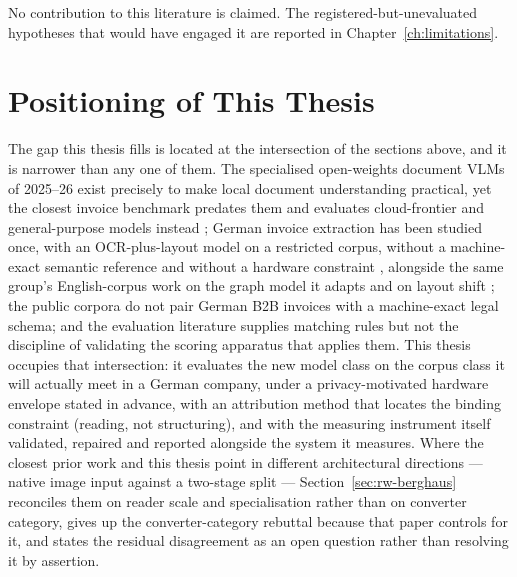 No contribution to this literature is claimed. The registered-but-unevaluated hypotheses
that would have engaged it are reported in Chapter~\ref{ch:limitations}.

\section{Positioning of This Thesis}
\label{sec:rw-positioning}

The gap this thesis fills is located at the intersection of the sections above, and it is narrower
than any one of them. The specialised
open-weights document \acp{VLM} of 2025--26 exist precisely to make local document
understanding practical, yet the closest invoice benchmark predates them and evaluates
cloud-frontier and general-purpose models instead \parencite{berghaus2025}; German invoice
extraction has been studied once, with an \ac{OCR}-plus-layout model on a restricted corpus,
without a machine-exact semantic reference and without a hardware constraint
\parencite{thiee2023invoices}, alongside the same group's English-corpus work on the graph
model it adapts and on layout shift \parencite{krieger2021german,krieger2023longtail}; the
public corpora do not pair German \ac{B2B} invoices with a machine-exact legal schema; and the
evaluation literature supplies matching rules but not the discipline of validating the scoring
apparatus that applies them. This thesis occupies that intersection: it evaluates the new
model class on the corpus class it will actually meet in a German company, under a
privacy-motivated hardware envelope stated in advance, with an attribution method that
locates the binding constraint (reading, not structuring), and with the measuring
instrument itself validated, repaired and reported alongside the system it measures.
Where the closest prior work and this thesis point in different architectural directions
--- native image input against a two-stage split --- Section~\ref{sec:rw-berghaus} reconciles them
on reader scale and specialisation rather than on converter category, gives up the
converter-category rebuttal because that paper controls for it, and states the residual
disagreement as an open question rather than resolving it by assertion.
